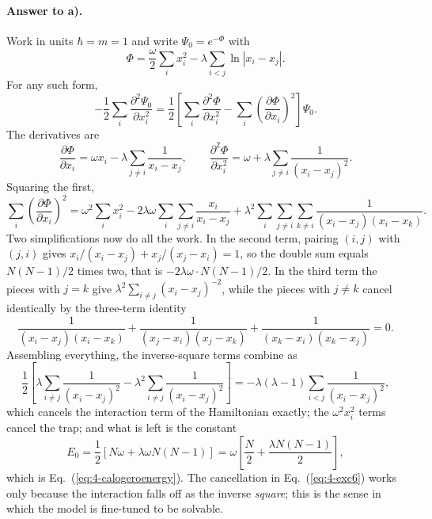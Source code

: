 \paragraph{Answer to a).}
Work in units $\hbar=m=1$ and write $\Psi_0=e^{-\Phi}$ with
\begin{equation}
  \Phi = \frac{\omega}{2}\sum_i x_i^2
       - \lambda\sum_{i<j}\ln|x_i-x_j| .
  \label{eq:4-exc1}
\end{equation}
For any such form,
\begin{equation}
  -\frac{1}{2}\sum_i\frac{\partial^2\Psi_0}{\partial x_i^2}
   = \frac{1}{2}\left[\sum_i\frac{\partial^2\Phi}{\partial x_i^2}
     - \sum_i\left(\frac{\partial\Phi}{\partial x_i}\right)^2\right]\Psi_0 .
  \label{eq:4-exc2}
\end{equation}
The derivatives are
\begin{equation}
  \frac{\partial\Phi}{\partial x_i} = \omega x_i
    - \lambda\sum_{j\ne i}\frac{1}{x_i-x_j},
  \qquad
  \frac{\partial^2\Phi}{\partial x_i^2} = \omega
    + \lambda\sum_{j\ne i}\frac{1}{(x_i-x_j)^2} .
  \label{eq:4-exc3}
\end{equation}
Squaring the first,
\begin{equation}
  \sum_i\left(\frac{\partial\Phi}{\partial x_i}\right)^2
   = \omega^2\sum_i x_i^2
   - 2\lambda\omega\sum_i\sum_{j\ne i}\frac{x_i}{x_i-x_j}
   + \lambda^2\sum_i\sum_{j\ne i}\sum_{k\ne i}
     \frac{1}{(x_i-x_j)(x_i-x_k)} .
  \label{eq:4-exc4}
\end{equation}
Two simplifications now do all the work.  In the second term, pairing $(i,j)$
with $(j,i)$ gives
$x_i/(x_i-x_j)+x_j/(x_j-x_i)=1$, so the double sum equals $N(N-1)/2$ times
two, that is $-2\lambda\omega\cdot N(N-1)/2$.  In the third term the pieces
with $j=k$ give $\lambda^2\sum_{i\ne j}(x_i-x_j)^{-2}$, while the pieces with
$j\ne k$ cancel identically by the three-term identity
\begin{equation}
  \frac{1}{(x_i-x_j)(x_i-x_k)}
  + \frac{1}{(x_j-x_i)(x_j-x_k)}
  + \frac{1}{(x_k-x_i)(x_k-x_j)} = 0 .
  \label{eq:4-exc5}
\end{equation}
Assembling everything, the inverse-square terms combine as
\begin{equation}
  \frac{1}{2}\left[\lambda\sum_{i\ne j}\frac{1}{(x_i-x_j)^2}
   - \lambda^2\sum_{i\ne j}\frac{1}{(x_i-x_j)^2}\right]
   = -\lambda(\lambda-1)\sum_{i<j}\frac{1}{(x_i-x_j)^2},
  \label{eq:4-exc6}
\end{equation}
which cancels the interaction term of the Hamiltonian exactly; the
$\omega^2 x_i^2$ terms cancel the trap; and what is left is the constant
\begin{equation}
  E_0 = \frac{1}{2}\left[N\omega + \lambda\omega N(N-1)\right]
      = \omega\left[\frac{N}{2}+\frac{\lambda N(N-1)}{2}\right],
  \label{eq:4-exc7}
\end{equation}
which is Eq.~(\ref{eq:4-calogeroenergy}).  The cancellation in
Eq.~(\ref{eq:4-exc6}) works only because the interaction falls off as the
inverse \emph{square}; this is the sense in which the model is fine-tuned to
be solvable.

